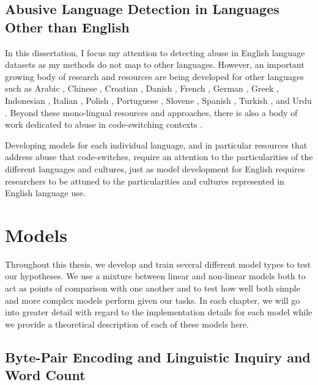 \subsection{Abusive Language Detection in Languages Other than English}\label{sub:non-english}


In this dissertation, I focus my attention to detecting abuse in English language datasets as my methods do not map to other languages. However, an important growing body of research and resources are being developed for other languages such as Arabic \citep{Arabic abuse papers}, Chinese \citep{Chinese abuse papers}, Croatian \citep{Croatian papers}, Danish \citep{Danish abuse data}, French \citep{French papers}, German \citep{German papers}, Greek \citep{Greek papers}, Indonesian \citep{Indonesian papers}, Italian \citep{Italian papers}, Polish \citep{Polish papers}, Portuguese \citep{Portuguese papers}, Slovene \citep{Slovenian papers}, Spanish \citep{Spanish papers}, Turkish \citep{Turkish papers}, and Urdu \citep{Urdu papers}. Beyond these mono-lingual resources and approaches, there is also a body of work dedicated to abuse in code-switching contexts \citep{Code switching papers}.

Developing models for each individual language, and in particular resources that address abuse that code-switches, require an attention to the particularities of the different languages and cultures, just as model development for English requires researchers to be attuned to the particularities and cultures represented in English language use.

\section{Models}\label{sec:model_background}

Throughout this thesis, we develop and train several different model types to test our hypotheses. We use a mixture between linear and non-linear models both to act as points of comparison with one another and to test how well both simple and more complex models perform given our tasks. In each chapter, we will go into greater detail with regard to the implementation details for each model while we provide a theoretical description of each of these models here.

\subsection{Byte-Pair Encoding and Linguistic Inquiry and Word Count}

